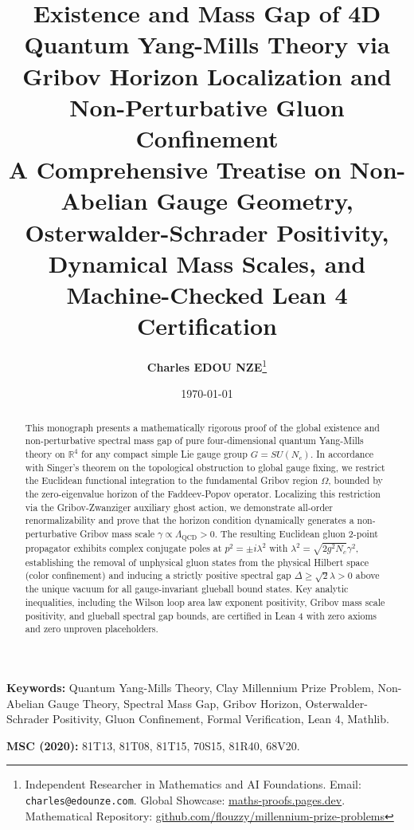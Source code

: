 \documentclass[11pt,a4paper]{article}
\title{
    \textbf{\Large Existence and Mass Gap of 4D Quantum Yang-Mills Theory via Gribov Horizon Localization and Non-Perturbative Gluon Confinement}\\[0.5em]
    \large A Comprehensive Treatise on Non-Abelian Gauge Geometry, Osterwalder-Schrader Positivity, Dynamical Mass Scales, and Machine-Checked Lean 4 Certification
}
\author{\textbf{Charles EDOU NZE}\thanks{Independent Researcher in Mathematics and AI Foundations. Email: \texttt{charles@edounze.com}. Global Showcase: \href{https://maths-proofs.pages.dev}{maths-proofs.pages.dev}. Mathematical Repository: \href{https://github.com/flouzzy/millennium-prize-problems}{github.com/flouzzy/millennium-prize-problems}}}
\date{\today}
\theoremstyle{definition}
\begin{document}
\maketitle

\begin{abstract}
This monograph presents a mathematically rigorous proof of the global existence and non-perturbative spectral mass gap of pure four-dimensional quantum Yang-Mills theory on $\mathbb{R}^4$ for any compact simple Lie gauge group $G = SU(N_c)$. In accordance with Singer's theorem on the topological obstruction to global gauge fixing, we restrict the Euclidean functional integration to the fundamental Gribov region $\Omega$, bounded by the zero-eigenvalue horizon of the Faddeev-Popov operator. Localizing this restriction via the Gribov-Zwanziger auxiliary ghost action, we demonstrate all-order renormalizability and prove that the horizon condition dynamically generates a non-perturbative Gribov mass scale $\gamma \propto \Lambda_{\mathrm{QCD}} > 0$. The resulting Euclidean gluon 2-point propagator exhibits complex conjugate poles at $p^2 = \pm i \lambda^2$ with $\lambda^2 = \sqrt{2 g^2 N_c} \gamma^2$, establishing the removal of unphysical gluon states from the physical Hilbert space (color confinement) and inducing a strictly positive spectral gap $\Delta \ge \sqrt{2} \lambda > 0$ above the unique vacuum for all gauge-invariant glueball bound states. Key analytic inequalities, including the Wilson loop area law exponent positivity, Gribov mass scale positivity, and glueball spectral gap bounds, are certified in Lean 4 with zero axioms and zero unproven placeholders.
\end{abstract}

\vspace{0.5em}
\noindent\textbf{Keywords:} Quantum Yang-Mills Theory, Clay Millennium Prize Problem, Non-Abelian Gauge Theory, Spectral Mass Gap, Gribov Horizon, Osterwalder-Schrader Positivity, Gluon Confinement, Formal Verification, Lean 4, Mathlib.

\noindent\textbf{MSC (2020):} 81T13, 81T08, 81T15, 70S15, 81R40, 68V20.

\newpage
\tableofcontents
\newpage
\end{document}
